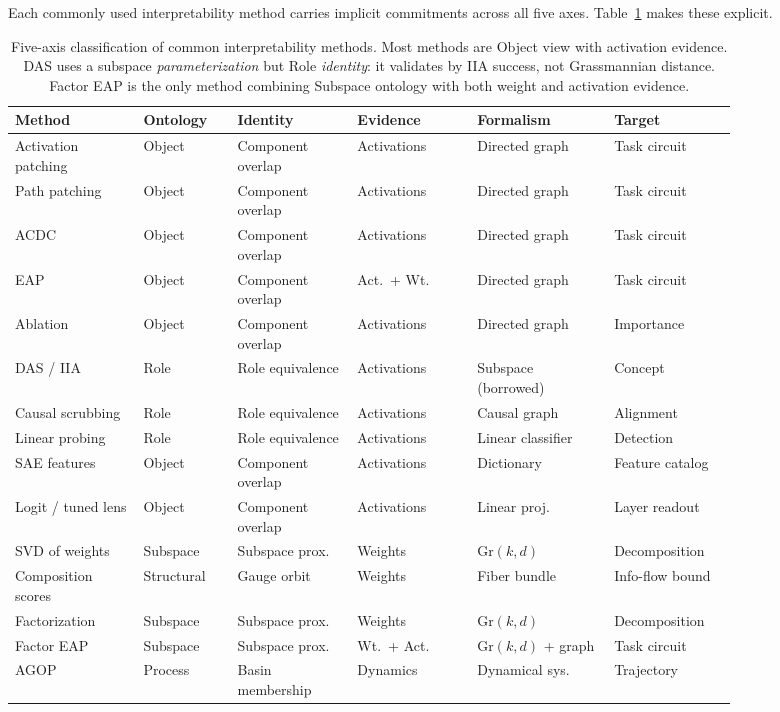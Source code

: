 \documentclass[11pt]{article}
\theoremstyle{remark}
\newcommand{\Gr}{\mathrm{Gr}}
\begin{document}
Each commonly used interpretability method carries implicit commitments
across all five axes.  Table~\ref{tab:methods} makes these explicit.

\begin{table}[ht]
\centering
\small
\setlength{\tabcolsep}{3.5pt}
\begin{tabular}{p{0.15\linewidth}p{0.11\linewidth}p{0.14\linewidth}p{0.14\linewidth}p{0.16\linewidth}p{0.14\linewidth}}
\toprule
\textbf{Method} & \textbf{Ontology} & \textbf{Identity} & \textbf{Evidence} & \textbf{Formalism} & \textbf{Target} \\
\midrule
Activation patching & Object & Component overlap & Activations & Directed graph & Task circuit \\[2pt]
Path patching       & Object & Component overlap & Activations & Directed graph & Task circuit \\[2pt]
ACDC                & Object & Component overlap & Activations & Directed graph & Task circuit \\[2pt]
EAP                 & Object & Component overlap & Act.\ + Wt. & Directed graph & Task circuit \\[2pt]
Ablation            & Object & Component overlap & Activations & Directed graph & Importance \\[2pt]
DAS / IIA           & Role   & Role equivalence  & Activations & Subspace (borrowed) & Concept \\[2pt]
Causal scrubbing    & Role   & Role equivalence  & Activations & Causal graph & Alignment \\[2pt]
Linear probing      & Role   & Role equivalence  & Activations & Linear classifier & Detection \\[2pt]
SAE features        & Object & Component overlap & Activations & Dictionary & Feature catalog \\[2pt]
Logit / tuned lens  & Object & Component overlap & Activations & Linear proj. & Layer readout \\[2pt]
SVD of weights      & Subspace & Subspace prox. & Weights & $\Gr(k,d)$ & Decomposition \\[2pt]
Composition scores  & Structural & Gauge orbit  & Weights & Fiber bundle & Info-flow bound \\[2pt]
Factorization       & Subspace & Subspace prox. & Weights & $\Gr(k,d)$ & Decomposition \\[2pt]
Factor EAP          & Subspace & Subspace prox. & Wt.\ + Act. & $\Gr(k,d)$ + graph & Task circuit \\[2pt]
AGOP                & Process & Basin membership  & Dynamics & Dynamical sys. & Trajectory \\
\bottomrule
\end{tabular}
\caption{Five-axis classification of common interpretability methods.  Most
  methods are Object view with activation evidence.  DAS uses a subspace
  \emph{parameterization} but Role \emph{identity}: it validates by IIA
  success, not Grassmannian distance.  Factor EAP is the only method
  combining Subspace ontology with both weight and activation evidence.}
\label{tab:methods}
\end{table}
\end{document}
